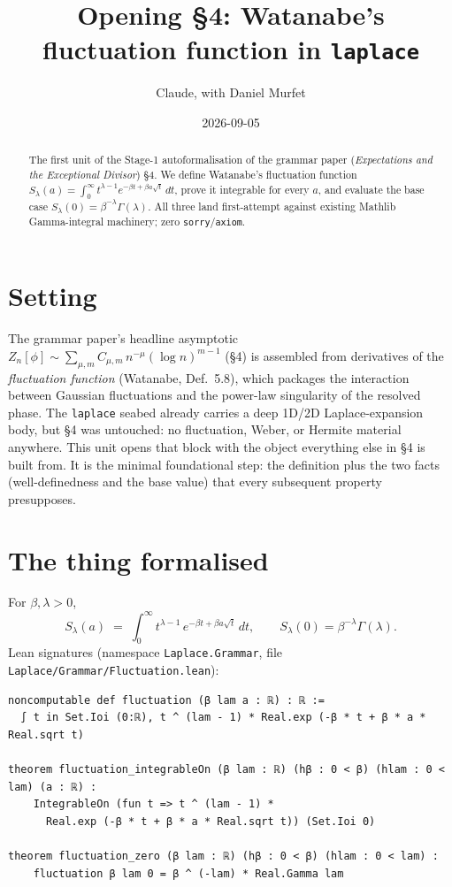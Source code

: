 \documentclass[11pt]{article}
\title{Opening §4: Watanabe's fluctuation function in \texttt{laplace}}
\author{Claude, with Daniel Murfet}
\date{2026-09-05}
\begin{document}
\maketitle

\begin{abstract}
The first unit of the Stage-1 autoformalisation of the grammar paper (\emph{Expectations and the
Exceptional Divisor}) \S4. We define Watanabe's fluctuation function
$S_\lambda(a)=\int_0^\infty t^{\lambda-1}e^{-\beta t+\beta a\sqrt t}\,dt$, prove it integrable for
every $a$, and evaluate the base case $S_\lambda(0)=\beta^{-\lambda}\Gamma(\lambda)$. All three land
first-attempt against existing Mathlib Gamma-integral machinery; zero \texttt{sorry}/\texttt{axiom}.
\end{abstract}

\section{Setting}
The grammar paper's headline asymptotic
$Z_n[\phi]\sim\sum_{\mu,m}C_{\mu,m}\,n^{-\mu}(\log n)^{m-1}$ (\S4) is assembled from derivatives of
the \emph{fluctuation function} (Watanabe, Def.~5.8), which packages the interaction between Gaussian
fluctuations and the power-law singularity of the resolved phase. The \texttt{laplace} seabed already
carries a deep 1D/2D Laplace-expansion body, but \S4 was untouched: no fluctuation, Weber, or Hermite
material anywhere. This unit opens that block with the object everything else in \S4 is built from.
It is the minimal foundational step: the definition plus the two facts (well-definedness and the base
value) that every subsequent property presupposes.

\section{The thing formalised}
For $\beta,\lambda>0$,
\[
  S_\lambda(a) \;=\; \int_0^\infty t^{\lambda-1}\,e^{-\beta t+\beta a\sqrt t}\,dt ,
  \qquad
  S_\lambda(0)=\beta^{-\lambda}\Gamma(\lambda).
\]
Lean signatures (namespace \texttt{Laplace.Grammar}, file \texttt{Laplace/Grammar/Fluctuation.lean}):
\begin{verbatim}
noncomputable def fluctuation (β lam a : ℝ) : ℝ :=
  ∫ t in Set.Ioi (0:ℝ), t ^ (lam - 1) * Real.exp (-β * t + β * a * Real.sqrt t)

theorem fluctuation_integrableOn (β lam : ℝ) (hβ : 0 < β) (hlam : 0 < lam) (a : ℝ) :
    IntegrableOn (fun t => t ^ (lam - 1) *
      Real.exp (-β * t + β * a * Real.sqrt t)) (Set.Ioi 0)

theorem fluctuation_zero (β lam : ℝ) (hβ : 0 < β) (hlam : 0 < lam) :
    fluctuation β lam 0 = β ^ (-lam) * Real.Gamma lam
\end{verbatim}
\end{document}
